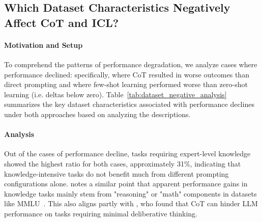 \subsection{Which Dataset Characteristics Negatively Affect CoT and ICL?}
\label{subsection:negative_analysis_dataset_characteristics}

\begin{table}[t!]
\centering
{}
\caption{A qualitative analysis of dataset characteristics that resulted in decreased performance with CoT or ICL, compared to direct prompting or zero-shot set-up.
Key characteristics refer to the representative traits identified through qualitative analysis. The CoT and ICL ratios indicate the proportion of these traits among all negative cases for each method.}
\label{tab:dataset_negative_analysis}
\end{table}


\paragraph{Motivation and Setup} 
To comprehend the patterns of performance degradation, we analyze cases where performance declined: specifically, where CoT resulted in worse outcomes than direct prompting and where few-shot learning performed worse than zero-shot learning (i.e. deltas below zero). 
Table~\ref{tab:dataset_negative_analysis} summarizes the key dataset characteristics associated with performance declines under both approaches based on analyzing the descriptions.


\paragraph{Analysis} 
Out of the cases of performance decline, tasks requiring expert-level knowledge showed the highest ratio for both cases, approximately 31\%, indicating that knowledge-intensive tasks do not benefit much from different prompting configurations alone. 
\citet{sprague2024cot} notes a similar point that apparent performance gains in knowledge tasks mainly stem from "reasoning" or "math" components in datasets like MMLU~\citep{hendrycksmeasuring}.  
This also aligns partly with \citet{liu2024mind}, who found that CoT can hinder LLM performance on tasks requiring minimal deliberative thinking.  

